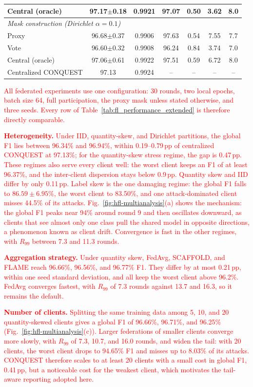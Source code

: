\documentclass[conference]{IEEEtran}
\begin{document}
\begin{table}[!t]
\begin{tabular}{lcccccc}
Central (oracle) & 97.17$\pm$0.18 & 0.9921 & 97.07 & 0.50 & 3.62 & 8.0 \\
\midrule
\multicolumn{7}{l}{\textit{Mask construction (Dirichlet $\alpha{=}0.1$)}} \\
Proxy & 96.68$\pm$0.37 & 0.9906 & 97.63 & 0.54 & 7.55 & 7.7 \\
Vote & 96.60$\pm$0.32 & 0.9908 & 96.24 & 0.84 & 3.74 & 7.0 \\
Central (oracle) & 97.06$\pm$0.61 & 0.9922 & 97.51 & 0.59 & 6.72 & 8.0 \\
\midrule
Centralized CONQUEST & 97.13 & 0.9924 & -- & -- & -- & -- \\
\hline\toprule
\end{tabular}
\end{table}

\textcolor{red}{All federated experiments
use one configuration: 30 rounds, two local epochs, batch size 64,
full participation, the proxy mask unless stated otherwise, and three
seeds. Every row of Table~\ref{tab:fl_performance_extended} is
therefore directly comparable.}

\textcolor{red}{\textbf{Heterogeneity.} Under IID,
quantity-skew, and Dirichlet partitions, the global F1 lies between
96.34\% and 96.94\%, within 0.19--0.79\,pp of centralized CONQUEST at
97.13\%; for the quantity-skew stress regime, the gap is 0.47\,pp.
These regimes also serve every client well: the worst client keeps an
F1 of at least 96.37\%, and the inter-client dispersion stays below
0.9\,pp. Quantity skew and IID differ by only 0.11\,pp. Label skew is the one
damaging regime: the global F1 falls to $86.59\pm6.95\%$, the worst
client to 83.50\%, and one attack-dominated client misses 44.5\% of
its attacks. Fig.~\ref{fig:hfl-multianalysis}(a) shows the mechanism:
the global F1 peaks near 94\% around round 9 and then oscillates
downward, as clients that see almost only one class pull the shared
model in opposite directions, a phenomenon known as client drift.
Convergence is fast in the other regimes, with $R_{99}$ between 7.3
and 11.3 rounds.}

\textcolor{red}{\textbf{Aggregation
strategy.} Under quantity skew, FedAvg, SCAFFOLD, and FLAME reach
96.66\%, 96.56\%, and 96.77\% F1. They differ by at most 0.21\,pp,
within one seed standard deviation, and all keep the worst client
above 96.2\%. FedAvg converges fastest, with $R_{99}$ of 7.3 rounds
against 13.7 and 16.3, so it remains the default.}

\textcolor{red}{\textbf{Number of clients.} Splitting the
same training data among 5, 10, and 20 quantity-skewed clients gives a
global F1 of 96.66\%, 96.71\%, and 96.25\%
(Fig.~\ref{fig:hfl-multianalysis}(c)). Larger federations of smaller
clients converge more slowly, with $R_{99}$ of 7.3, 10.7, and 16.0
rounds, and widen the tail: with 20 clients, the worst client drops to
94.65\% F1 and misses up to 8.03\% of its attacks. CONQUEST therefore
scales to at least 20 clients with a small cost in global F1,
0.41\,pp, but a noticeable cost for the weakest client, which
motivates the tail-aware reporting adopted here.}
\end{document}
